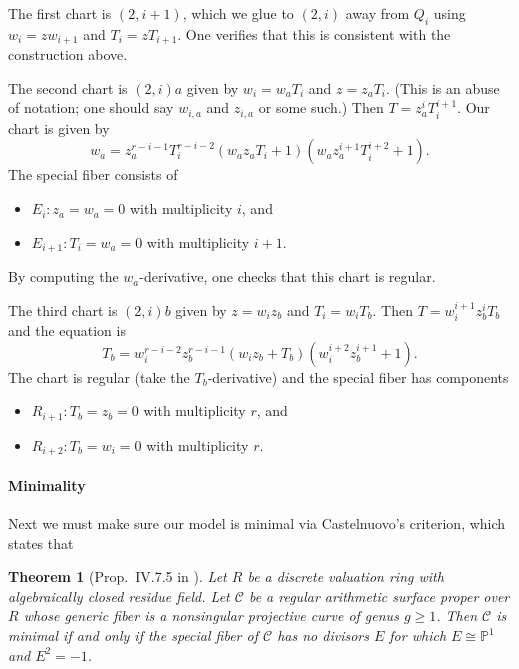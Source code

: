 \documentclass{article}
\newcommand{\scd}{\mathscr{C}}
\theoremstyle{plain}
\newtheorem{theorem}{Theorem}[section]
\theoremstyle{definition}
\theoremstyle{remark}
\newcommand{\isom}{\cong}
\newcommand{\Pro}{\ensuremath{\mathbb{P}}}
\begin{document}
  The first chart is $(2,i+1)$, which we glue to $(2,i)$ away from $Q_i$ using $w_i = z w_{i+1}$ and $T_i = z T_{i+1}$. One verifies that this is consistent with the construction above.

  The second chart is $(2,i)a$ given by $w_i = w_a T_i$ and $z = z_a T_i$. (This is an abuse of notation; one should say $w_{i,a}$ and $z_{i,a}$ or some such.) Then $T = z_a^i T_i^{i+1}$. Our chart is given by
  \[
  w_a = z_a^{r-i-1} T_i^{r-i-2} (w_a z_a T_i + 1) (w_a z_a^{i+1} T_i^{i+2} + 1).
  \]
  The special fiber consists of
  \begin{itemize}
      \item $E_i: z_a = w_a = 0$ with multiplicity $i$, and
      \item $E_{i+1}: T_i = w_a = 0$ with multiplicity $i+1$.
  \end{itemize}
  By computing the $w_a$-derivative, one checks that this chart is regular.

  The third chart is $(2,i)b$ given by $z = w_i z_b$ and $T_i = w_i T_b$. Then $T = w_i^{i+1} z_b^i T_b$ and the equation is
  \[
  T_b = w_i^{r-i-2} z_b^{r-i-1} (w_i z_b + T_b) (w_i^{i+2} z_b^{i+1} + 1).
  \]
  The chart is regular (take the $T_b$-derivative) and the special fiber has components
  \begin{itemize}
      \item $R_{i+1}: T_b = z_b = 0$ with multiplicity $r$, and
      \item $R_{i+2}: T_b = w_i = 0$ with multiplicity $r$.
  \end{itemize}






\paragraph{Minimality}
\label{sec:minimality}

Next we must make sure our model is minimal via Castelnuovo's criterion, which states that
\begin{theorem}[Prop.~IV.7.5 in \cite{silvermanATAEC}]\label{thm:castelnuovo}
  Let $R$ be a discrete valuation ring with algebraically closed residue field. Let $\scd$ be a regular arithmetic surface proper over $R$ whose generic fiber is a nonsingular projective curve of genus $g \geq 1$. Then $\scd$ is minimal if and only if the special fiber of $\scd$ has no divisors $E$ for which $E \isom \Pro^1$ and $E^2 = -1$.
\end{theorem}
\end{document}
